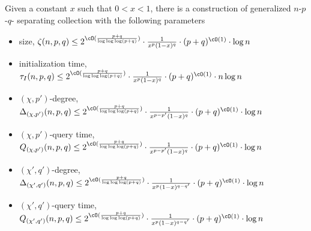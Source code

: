 \begin{lemma}
\label{lem:twin_sep_coll_construction}
Given a constant $x$ such that $0<x<1$, there is a construction of generalized $n$-$p$-$q$- separating collection with the following parameters
\begin{itemize} 
\setlength\itemsep{-.7mm}
\item size, $\zeta(n,p,q) \leq 2^{\cO(\frac{p+q}{\log\log\log(p+q)})}\cdot \frac{1}{x^p(1-x)^q}\cdot (p+q)^{\cO(1)} \cdot \log n$
\item initialization time, $\tau_I(n,p,q) \leq  2^{\cO(\frac{p+q}{\log\log\log(p+q)})}\cdot \frac{1}{x^p(1-x)^q}\cdot (p+q)^{\cO(1)} \cdot n\log n$
\item $(\chi,p')$-degree, $\Delta_{(\chi,p')}(n,p,q) \leq  2^{\cO(\frac{p+q}{\log\log\log(p+q)})}\cdot \frac{1}{x^{p-p'}(1-x)^q}\cdot (p+q)^{\cO(1)} \cdot \log n$
\item $(\chi,p')$-query time, $Q_{(\chi,p')}(n,p,q) \leq  2^{\cO(\frac{p+q}{\log\log\log(p+q)})}\cdot \frac{1}{x^{p-p'}(1-x)^q}\cdot (p+q)^{\cO(1)} \cdot \log n$
\item $(\chi',q')$-degree, $\Delta_{(\chi',q')}(n,p,q) \leq  2^{\cO(\frac{p+q}{\log\log\log(p+q)})}\cdot \frac{1}{x^{p}(1-x)^{q-q'}}\cdot (p+q)^{\cO(1)} \cdot \log n$
\item $(\chi',q')$-query time, $Q_{(\chi',q')}(n,p,q) \leq  2^{\cO(\frac{p+q}{\log\log\log(p+q)})}\cdot \frac{1}{x^{p}(1-x)^{q-q'}}\cdot (p+q)^{\cO(1)} \cdot \log n$
\end{itemize}
\end{lemma}

